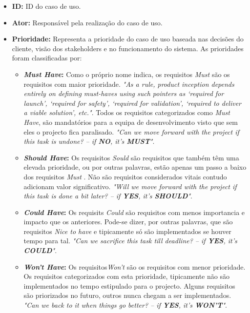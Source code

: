 \begin{itemize}
	\item \textbf{ID:} ID do caso de uso.
	\item \textbf{Ator:} Responsável pela realização do caso de uso.
	\item \textbf{Prioridade:} Representa a prioridade do caso de uso baseada nas decisões do cliente, visão dos stakeholders e no funcionamento do sistema. As prioridades foram classificadas por:
	\begin{itemize}
		\item \textbf{\textit{Must Have}:} Como o próprio nome indica, os requisitos \textit{Must} são os requisitos com maior prioridade. \textit{"As a rule, product inception depends entirely on defining must-haves using such pointers as ‘required for launch’, ‘required for safety’, ‘required for validation’, ‘required to deliver a viable solution’, etc."}\cite{moscow}. Todos os requisitos categorizados como \textit{Must Have}, são mandatórios para a equipa de desenvolvimento visto que sem eles o projecto fica paralisado.\textit{ "Can we move forward with the project if this task is undone? – if \textbf{NO}, it’s \textbf{MUST}"}\cite{moscow}.
		\item \textbf{\textit{Should Have}:} Os requisitos \textit{Sould} são requisitos que também têm uma elevada prioridade, ou por outras palavras, estão apenas um passo a baixo dos requisitos \textit{Must} .
		Não são requisitos considerados vitais contudo adicionam valor significativo.\textit{ "Will we move forward with the project if this task is done a bit later? – if \textbf{YES}, it’s \textbf{SHOULD}"}\cite{moscow}.
		\item \textbf{\textit{Could Have}:} Os requisits \textit{Could} são requisitos com menos importancia e impacto que os anteriores. Pode-se dizer, por outras palavras, que são requisitos \textit{Nice to have} e tipicamente só são implementados se houver tempo para tal. \textit{ "Can we sacrifice this task till deadline? – if \textbf{YES}, it’s \textbf{COULD}"}\cite{moscow}.
		\item \textbf{\textit{Won't Have}:} Os requisitos\textit{Won't} são os requisitos com menor prioridade. Os requisitos categorizados com esta prioridade, tipicamente não são implementados no tempo estipulado para o projecto. Alguns requisitos são priorizados no futuro, outros nunca chegam a ser implementados. \textit{ "Can we back to it when things go better? – if \textbf{YES}, it’s \textbf{WON’T}"}\cite{moscow}.
	\end{itemize}

\end{itemize}
